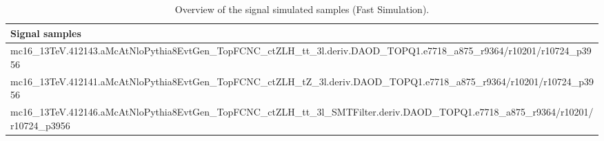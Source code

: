 \begin{table}[htbp]
	\caption{
		Overview of the signal simulated samples (Fast Simulation).
	}%
	\label{tab:mc_sig_nom}
	\notsotiny
	\centering
	\begin{adjustwidth}{-0.6cm}{}
	\begin{tabular}{l}
		\toprule
		\textbf{Signal samples} \\
		\hline
		mc16\_13TeV.412143.aMcAtNloPythia8EvtGen\_TopFCNC\_ctZLH\_tt\_3l.deriv.DAOD\_TOPQ1.e7718\_a875\_r9364/r10201/r10724\_p3956 \\
		mc16\_13TeV.412141.aMcAtNloPythia8EvtGen\_TopFCNC\_ctZLH\_tZ\_3l.deriv.DAOD\_TOPQ1.e7718\_a875\_r9364/r10201/r10724\_p3956 \\
		mc16\_13TeV.412146.aMcAtNloPythia8EvtGen\_TopFCNC\_ctZLH\_tt\_3l\_SMTFilter.deriv.DAOD\_TOPQ1.e7718\_a875\_r9364/r10201/r10724\_p3956 \\
		\bottomrule
		\end{tabular}
	 \end{adjustwidth}
\end{table}

